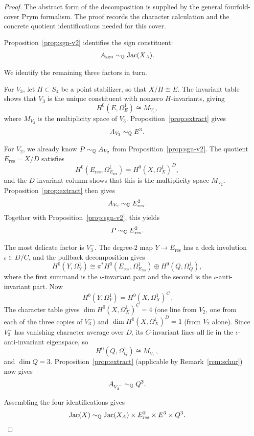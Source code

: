 \begin{proof}
The abstract form of the decomposition is supplied by the general fourfold-cover Prym formalism. The proof records the character calculation and the concrete quotient identifications needed for this cover.

Proposition~\ref{prop:sgn-v2} identifies the sign constituent:
\[
A_{\mathrm{sgn}}\sim_{\mathbb{Q}}\operatorname{Jac}(X_A).
\]

We identify the remaining three factors in turn.

For \(V_3\), let \(H\subset S_4\) be a point stabilizer, so that \(X/H\cong E\). The invariant table shows that \(V_3\) is the unique constituent with nonzero \(H\)-invariants, giving
\[
H^0(E,\Omega_E^1)\cong M_{V_3},
\]
where \(M_{V_3}\) is the multiplicity space of \(V_3\). Proposition~\ref{prop:extract} gives
\[
A_{V_3}\sim_{\mathbb{Q}} E^3.
\]

For \(V_2\), we already know \(P\sim_{\mathbb{Q}}A_{V_2}\) from Proposition~\ref{prop:sgn-v2}. The quotient \(E_{\mathrm{res}}=X/D\) satisfies
\[
H^0(E_{\mathrm{res}},\Omega_{E_{\mathrm{res}}}^1)=H^0(X,\Omega_X^1)^D,
\]
and the \(D\)-invariant column shows that this is the multiplicity space \(M_{V_2}\). Proposition~\ref{prop:extract} then gives
\[
A_{V_2}\sim_{\mathbb{Q}} E_{\mathrm{res}}^2.
\]
Together with Proposition~\ref{prop:sgn-v2}, this yields
\[
P\sim_{\mathbb{Q}}E_{\mathrm{res}}^2.
\]

The most delicate factor is \(V_3^-\). The degree-\(2\) map \(Y\to E_{\mathrm{res}}\) has a deck involution \(\iota\in D/C\), and the pullback decomposition gives
\[
H^0(Y,\Omega_Y^1)\cong \pi^*H^0(E_{\mathrm{res}},\Omega_{E_{\mathrm{res}}}^1)\oplus H^0(Q,\Omega_Q^1),
\]
where the first summand is the \(\iota\)-invariant part and the second is the \(\iota\)-anti-invariant part.
Now
\[
H^0(Y,\Omega_Y^1)=H^0(X,\Omega_X^1)^C.
\]
The character table gives \(\dim H^0(X,\Omega_X^1)^C=4\) (one line from \(V_2\), one from each of the three copies of \(V_3^-\)) and \(\dim H^0(X,\Omega_X^1)^D=1\) (from \(V_2\) alone). Since \(V_3^-\) has vanishing character average over \(D\), its \(C\)-invariant lines all lie in the \(\iota\)-anti-invariant eigenspace, so
\[
H^0(Q,\Omega_Q^1)\cong M_{V_3^-},
\]
and \(\dim Q=3\). Proposition~\ref{prop:extract} (applicable by Remark~\ref{rem:schur}) now gives
\[
A_{V_3^-}\sim_{\mathbb{Q}} Q^3.
\]

Assembling the four identifications gives
\[
\operatorname{Jac}(X)\sim_{\mathbb{Q}}\operatorname{Jac}(X_A)\times E_{\mathrm{res}}^2\times E^3\times Q^3.
\]
\end{proof}

